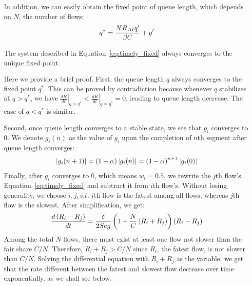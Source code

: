 In addition, we can easily obtain the fixed point of queue length, which depends on $N$, the number of flows:
\begin{equation}
\small
{q^*} = \frac{{N{R_{AI}}q'}}{{\beta C}} + q'
\label{eq:timely_fixed_q}
\end{equation}
\begin{thm}
The system described in Equation~\ref{eq:timely_fixed} always converges to the unique fixed point.
\end{thm}
Here we provide a brief proof. First, the queue length $q$ always
converges to the fixed point $q^*$. This can be proved by contradiction because whenever $q$ stabilizes
at $q>q^*$, we have ${\left. {\frac{{dR}}{{dt}}} \right|_{q > {q^*}}} < {\left. {\frac{{dR}}{{dt}}} \right|_{q = {q^*}}} = 0$, 
leading to queue length decrease. The case of $q<q^*$ is similar. 

Second, once queue length converges to a stable state, we see that $g_i$ converges to 0.
We denote ${g_i}(n)$ as the value of $g_i$ upon the completion of $n$th segment after queue
length converges:
\begin{equation}
\small
\left| {{g_i}(n + 1)} \right| = \left( {1 - \alpha} \right)\left| {{g_i}(n)} \right| = {\left( {1 - \alpha} \right)}^{n+1} \left| {{g_i}(0)} \right|
\end{equation}
Finally, after $g_i$ converges to 0, which means $w_i=0.5$, we rewrite the $j$th flow's Equation~\ref{eq:timely_fixed} 
and subtract it from $i$th flow's. Without losing generality, we choose $i,j, s.t.$ $i$th flow is the fatest among all flows,
whereas $j$th flow is the slowest. After simplification, we get:
\begin{equation}
\small
\frac{{d\left( {{R_i} - {R_j}} \right)}}{{dt}} = \frac{\delta }{{2Seg}}\left( {1 - \frac{N}{C}\left( {{R_i} + {R_j}} \right)} \right)\left( {{R_i} - {R_j}} \right)
\end{equation}
Among the total $N$ flows, there must exist at least one flow not slower than the fair share $C/N$.
Therefore, ${{R_i} + {R_j}} > C/N$ since $R_i$, the fatest flow, is not slower than $C/N$.
Solving the differential equation with ${{R_i} + {R_j}}$ as the variable, we get that the rate 
different between the fatest and slowest flow decrease over time exponentially, as we shall see below. 

